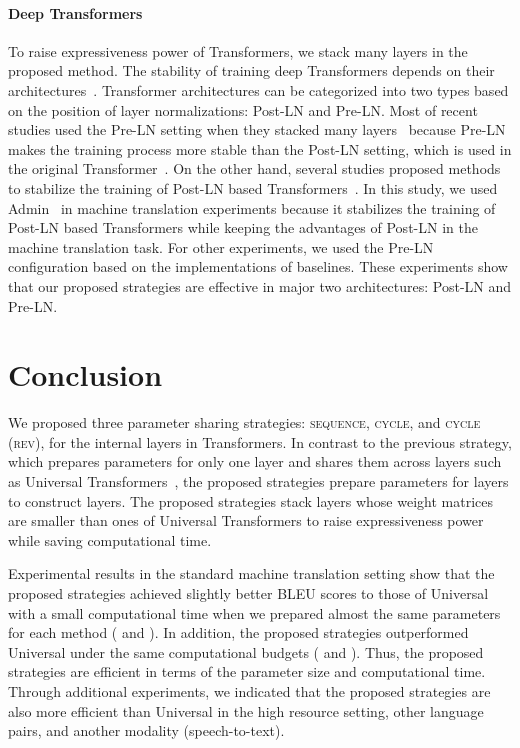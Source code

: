 \documentclass[11pt]{article}
\begin{document}
\paragraph{Deep Transformers}
To raise expressiveness power of Transformers, we stack many layers in the proposed method.
The stability of training deep Transformers depends on their architectures~\cite{iwslt-2019-transformer,layer-normalization-icml2020,liu-etal-2020-understanding}.
Transformer architectures can be categorized into two types based on the position of layer normalizations: Post-LN and Pre-LN.
Most of recent studies used the Pre-LN setting when they stacked many layers~\cite{wang-etal-2019-learning,NEURIPS2020_1457c0d6} because Pre-LN makes the training process more stable than the Post-LN setting, which is used in the original Transformer~\cite{iwslt-2019-transformer,layer-normalization-icml2020}.
On the other hand, several studies proposed methods to stabilize the training of Post-LN based Transformers~\cite{liu-etal-2020-understanding,takase:2022:b2t}.
In this study, we used Admin~\cite{liu-etal-2020-understanding} in machine translation experiments because it stabilizes the training of Post-LN based Transformers while keeping the advantages of Post-LN in the machine translation task.
For other experiments, we used the Pre-LN configuration based on the implementations of baselines.
These experiments show that our proposed strategies are effective in major two architectures: Post-LN and Pre-LN.


\section{Conclusion}
We proposed three parameter sharing strategies: \textsc{sequence}, \textsc{cycle}, and \textsc{cycle (rev)}, for the internal layers in Transformers.
In contrast to the previous strategy, which prepares parameters for only one layer and shares them across layers such as Universal Transformers~\cite{dehghani2019}, the proposed strategies prepare parameters for  layers to construct  layers.
The proposed strategies stack layers whose weight matrices are smaller than ones of Universal Transformers to raise expressiveness power while saving computational time.

Experimental results in the standard machine translation setting show that the proposed strategies achieved slightly better BLEU scores to those of Universal with a small computational time when we prepared almost the same parameters for each method ( and ).
In addition, the proposed strategies outperformed Universal under the same computational budgets ( and ).
Thus, the proposed strategies are efficient in terms of the parameter size and computational time.
Through additional experiments, we indicated that the proposed strategies are also more efficient than Universal in the high resource setting, other language pairs, and another modality (speech-to-text).
\end{document}
